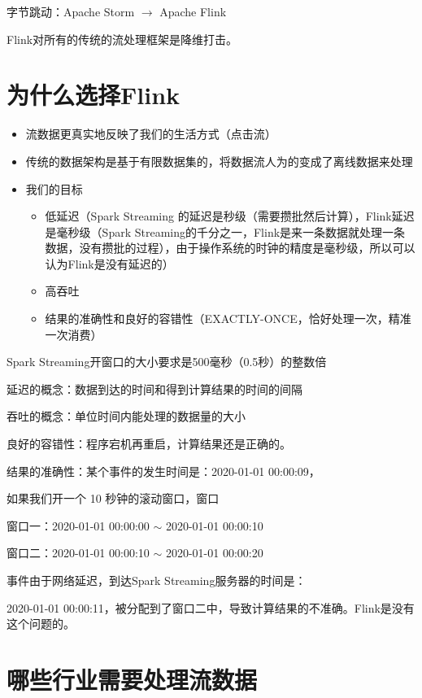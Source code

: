 \documentclass[cn,11pt,chinese]{elegantbook}
\begin{document}
字节跳动：Apache Storm $\rightarrow$ Apache Flink

Flink对所有的传统的流处理框架是降维打击。

\section{为什么选择Flink}

\begin{itemize}
  \item 流数据更真实地反映了我们的生活方式（点击流）
  \item 传统的数据架构是基于有限数据集的，将数据流人为的变成了离线数据来处理
  \item 我们的目标
    \begin{itemize}
      \item 低延迟（Spark Streaming 的延迟是秒级（需要攒批然后计算），Flink延迟是毫秒级（Spark Streaming的千分之一，Flink是来一条数据就处理一条数据，没有攒批的过程），由于操作系统的时钟的精度是毫秒级，所以可以认为Flink是没有延迟的）
      \item 高吞吐
      \item 结果的准确性和良好的容错性（EXACTLY-ONCE，恰好处理一次，精准一次消费）
    \end{itemize}
\end{itemize}

\begin{tcolorbox}
  Spark Streaming开窗口的大小要求是500毫秒（0.5秒）的整数倍

  延迟的概念：数据到达的时间和得到计算结果的时间的间隔
  
  吞吐的概念：单位时间内能处理的数据量的大小
  
  良好的容错性：程序宕机再重启，计算结果还是正确的。
  
  结果的准确性：某个事件的发生时间是：2020-01-01 00:00:09，
  
  如果我们开一个 10 秒钟的滚动窗口，窗口
  
  窗口一：2020-01-01 00:00:00 $\sim$ 2020-01-01 00:00:10
  
  窗口二：2020-01-01 00:00:10 $\sim$ 2020-01-01 00:00:20
  
  事件由于网络延迟，到达Spark Streaming服务器的时间是：
  
  2020-01-01 00:00:11，被分配到了窗口二中，导致计算结果的不准确。Flink是没有这个问题的。
\end{tcolorbox}

\section{哪些行业需要处理流数据}
\end{document}
